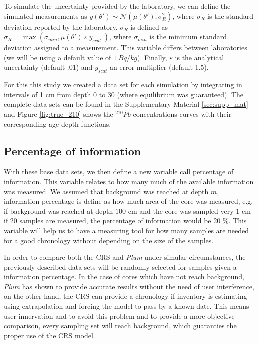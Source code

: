 \documentclass [10pt] {article}
\begin{document}
	To simulate the uncertainty provided by the laboratory, we can define the simulated measurements as  $y(\theta')\sim\mathcal{N}\left(\mu(\theta'),\sigma_R^2\right)$, where $\sigma_R$ is the standard deviation reported by the laboratory. 
$\sigma_R$ is defined as $\sigma_R= \max \left(\sigma_{min}, \mu(\theta')~\varepsilon~y_{scat}~\right)$, where $\sigma_{min}$ is the minimum standard deviation assigned to a measurement. This variable differs between laboratories (we will be using a default value of $1~ Bq/kg$). 
Finally, $\varepsilon$ is the analytical uncertainty (default .01) and $y_{scat}$ an error multiplier (default 1.5).

	For this this study we created a data set for each simulation by integrating in intervals of 1 cm from depth 0 to 30 (where equilibrium was guaranteed).
The complete data sets can be found in the Supplementary Material \ref{sec:supp_mat} and Figure \ref{fig:true_210} shows the $^{210}Pb$ concentrations curves with their corresponding age-depth functions. 

\subsection{Percentage of information}

	With these base data sets, we then define a new variable call percentage of information. 
This variable relates to how many much of the available information was measured. 
We assumed that background was reached at depth $m$, information percentage is define as how much area of the core was measured, e.g. if background was reached at depth $100$ cm and the core was sampled very $1$ cm if 20 samples are measured, the percentage of information would be 20 \%. 
This variable will help us to have a measuring tool for how many samples are needed for a good chronology without depending on the size of the samples. 

In order to compare both the CRS and \textit{Plum} under simular circumstances, the previously described data sets will be randomly selected for samples given a information percentage. 
In the case of cores which have not reach background, \textit{Plum} \citep{Aquino2018} has shown to provide accurate results without the need of user interference, on the other hand, the CRS can provide a chronology if inventory is estimating using extrapolation and forcing the model to pass by a known date.
This means user innervation and to avoid this problem and to provide a more objective comparison, every sampling set will reach background, which guaranties the proper use of the CRS model. 
\end{document}
